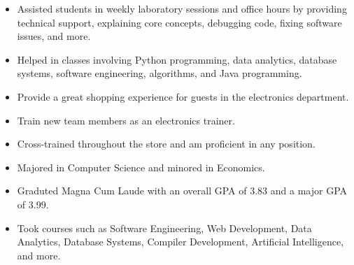 \documentclass[10pt,a4paper]{altacv}
\begin{document}
\divider

\begin{itemize}
\item Assisted students in weekly laboratory sessions and office hours by providing technical support, explaining core concepts, debugging code, fixing software issues, and more.
\item Helped in classes involving Python programming, data analytics, database systems, software engineering, algorithms, and Java programming.
\end{itemize}

\divider

\begin{itemize}
\item Provide a great shopping experience for guests in the electronics department.
\item Train new team members as an electronics trainer.
\item Cross-trained throughout the store and am proficient in any position.
\end{itemize}


\begin{itemize}
\item Majored in Computer Science and minored in Economics.
\item Graduted Magna Cum Laude with an overall GPA of 3.83 and a major GPA of 3.99.
\item Took courses such as Software Engineering, Web Development, Data Analytics, Database Systems, Compiler Development, Artificial Intelligence, and more.
\end{itemize}
\medskip
\end{document}
